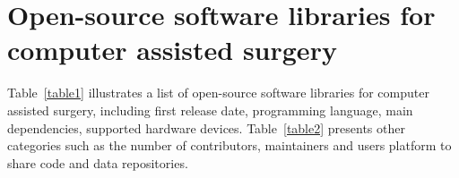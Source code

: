 \documentclass{article}
\begin{document}
\section{Open-source software libraries for computer assisted surgery}
Table~\ref{table1} illustrates a list of open-source software libraries for computer assisted surgery, including first release date, programming language, main dependencies, supported hardware devices.
Table~\ref{table2} presents other categories such as the number of contributors, maintainers and users platform to share code and data repositories. 
\end{document}
